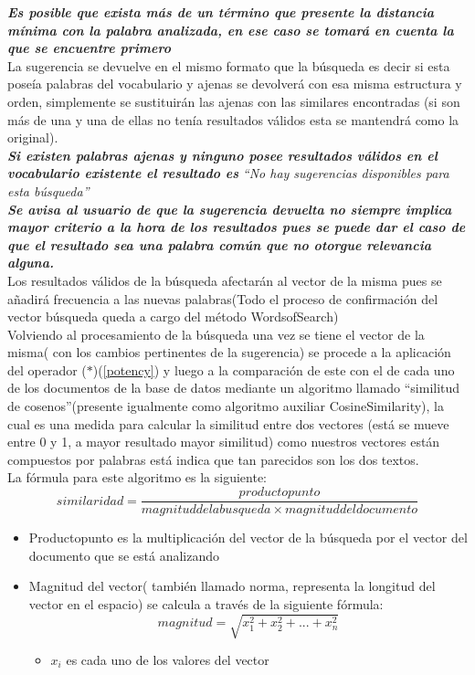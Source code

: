 \documentclass[options]{article}
\begin{document}
\textbf{\textit{Es posible que exista más de un término que presente la distancia mínima con la palabra analizada, en ese caso se tomará en cuenta la que se encuentre primero}}\\
La sugerencia se devuelve en el mismo formato que la búsqueda es decir si esta poseía palabras del vocabulario y ajenas se devolverá con esa misma estructura y orden, simplemente se sustituirán las ajenas con las similares encontradas (si son más de una y una de ellas no tenía resultados válidos esta se mantendrá como la original).\\
\textbf{\textit{Si existen palabras ajenas y ninguno posee resultados válidos en el vocabulario existente el resultado es}}
\textit{“No hay sugerencias disponibles para esta búsqueda”}\\
\textbf{\textit{Se avisa al usuario de que la sugerencia devuelta no siempre implica mayor criterio a la hora de los resultados pues se puede dar el caso de que el resultado sea una palabra común que no otorgue relevancia alguna.}}\\
Los resultados válidos de la búsqueda afectarán al vector de la misma pues se añadirá frecuencia a las nuevas palabras(Todo el proceso de confirmación del vector búsqueda queda a cargo del método WordsofSearch)\\
Volviendo al procesamiento de la búsqueda una vez se tiene el vector de la misma( con los cambios pertinentes de la sugerencia) se procede a la aplicación del operador ($\ast$)(\ref{potency}) y luego a la comparación de este con el de cada uno de los documentos de la base de datos mediante un algoritmo llamado “similitud de cosenos”(presente igualmente como algoritmo auxiliar CosineSimilarity), la cual es una medida para calcular la similitud entre dos vectores (está se mueve entre 0 y 1, a mayor resultado mayor similitud) como nuestros vectores están compuestos por palabras está indica que tan parecidos son los dos textos.\\
La fórmula para este algoritmo es la siguiente:\\
\begin{equation}
    similaridad = \frac{producto punto}{magnitud de la busqueda \times magnitud del documento} 
\end{equation}
\begin{itemize}
    \item Productopunto es la multiplicación del vector de la búsqueda por el vector del documento que se está analizando
    \item Magnitud del vector( también llamado norma, representa la longitud del vector en el espacio) se calcula a través de la siguiente fórmula:\\
    \begin{equation}
        magnitud = \sqrt{x_{1}^{2} + x_{2}^{2} + ... + x_{n}^{2}}
    \end{equation}
    \begin{itemize}
        \item $x_{i}$ es cada uno de los valores del vector
    \end{itemize}
\end{itemize}
\end{document}
